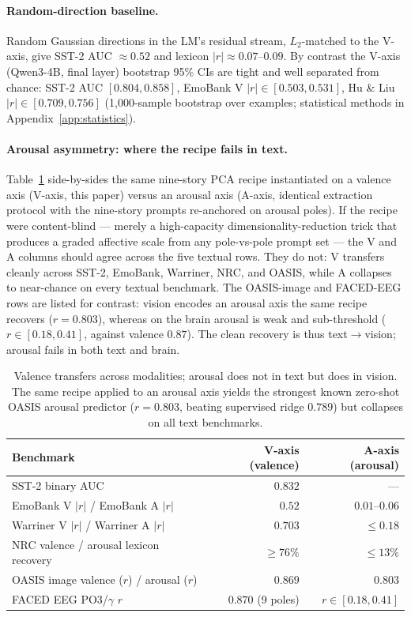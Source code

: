 \paragraph{Random-direction baseline.}
Random Gaussian directions in the LM's residual stream, $L_2$-matched
to the V-axis, give SST-2 AUC $\approx 0.52$ and lexicon $|r| \approx
0.07$--$0.09$. By contrast the V-axis (Qwen3-4B, final layer) bootstrap
95\% CIs are tight and
well separated from chance: SST-2 AUC $[0.804, 0.858]$, EmoBank V
$|r|\in[0.503, 0.531]$, Hu \& Liu $|r| \in [0.709, 0.756]$
(1{,}000-sample bootstrap over examples; statistical methods in
Appendix~\ref{app:statistics}).

\paragraph{Arousal asymmetry: where the recipe fails in text.}
Table~\ref{tab:arousal-asymmetry} side-by-sides the same nine-story
PCA recipe instantiated on a valence axis (V-axis, this paper) versus
an arousal axis (A-axis, identical extraction protocol with the
nine-story prompts re-anchored on arousal poles). If the recipe were
content-blind --- merely a high-capacity dimensionality-reduction trick
that produces a graded affective scale from any pole-vs-pole prompt
set --- the V and A columns should agree across the five textual rows.
They do not: V transfers cleanly across SST-2, EmoBank, Warriner,
NRC, and OASIS, while A collapses to near-chance on every textual
benchmark. The OASIS-image and FACED-EEG rows are listed for
contrast: vision encodes an arousal axis the same recipe recovers
($r{=}0.803$), whereas on the brain arousal is weak and sub-threshold
($r\in[0.18,0.41]$, against valence $0.87$). The clean recovery is
thus text$\to$vision; arousal fails in both text and brain.

\begin{table}[h]
\centering
\small
\begin{tabular}{lrr}
\toprule
Benchmark & V-axis (valence) & A-axis (arousal) \\
\midrule
SST-2 binary AUC                         & $0.832$ & --- \\
EmoBank V $|r|$ / EmoBank A $|r|$        & $0.52$  & $0.01$--$0.06$ \\
Warriner V $|r|$ / Warriner A $|r|$      & $0.703$ & $\le 0.18$ \\
NRC valence / arousal lexicon recovery   & $\ge 76\%$ & $\le 13\%$ \\
OASIS image valence ($r$) / arousal ($r$)& $\mathbf{0.869}$ & $\mathbf{0.803}$ \\
FACED EEG PO3/$\gamma$ $r$               & $\mathbf{0.870}$ (9 poles) & $r \in [0.18, 0.41]$ \\
\bottomrule
\end{tabular}
\caption{Valence transfers across modalities; arousal does not in text
but does in vision. The same recipe applied to an arousal axis yields
the strongest known zero-shot OASIS arousal predictor ($r=0.803$,
beating supervised ridge $0.789$) but collapses on all text benchmarks.}
\label{tab:arousal-asymmetry}
\end{table}


